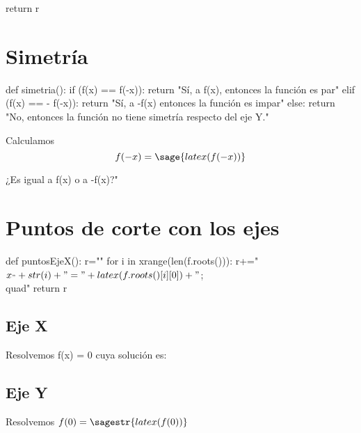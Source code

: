 \documentclass[nochap,palatino]{apuntes}
\begin{document}
\begin{problem}
\begin{sagesilent}
    return r

\end{sagesilent}


\section{Simetría}
\begin{sagesilent}
def simetria():
    if (f(x) == f(-x)):
        return "Sí, a f(x), entonces la función es par"
    elif (f(x) == - f(-x)):
        return "Sí, a -f(x) entonces la función es impar"
    else:
        return "No, entonces la función no tiene simetría respecto del eje Y."
\end{sagesilent}

Calculamos 
\[f(-x) = \sage{latex(f(-x))}\]

¿Es igual a f(x) o a -f(x)?" 

\section{Puntos de corte con los ejes}
\begin{sagesilent}
def puntosEjeX():
    r=""
    for i in xrange(len(f.roots())):
        r+="$x_"+str(i)+" = "+latex(f.roots()[i][0])+"$;\\quad"
    return r
\end{sagesilent}

\subsection{Eje X}
Resolvemos f(x) = 0 cuya solución es: 

\subsection{Eje Y}
Resolvemos $f(0)=\sagestr{latex(f(0))}$



\end{problem}
\end{document}

